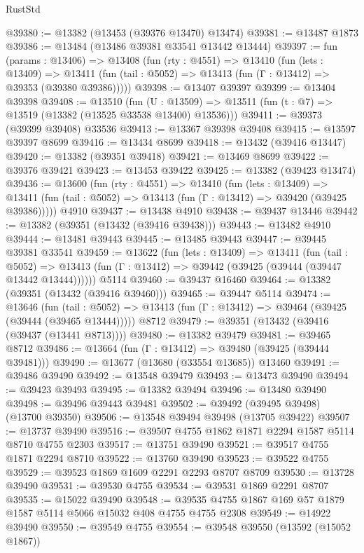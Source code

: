 \begin{lexlean}{RustStd}
\begin{coremodule}
@39380 := @13382 (@13453 (@39376 @13470) @13474)
@39381 := @13487 @1873
@39386 := @13484 (@13486 @39381 @33541 @13442 @13444)
@39397 := fun (params : @13406) =>
  @13408
    (fun (rty : @4551) =>
    @13410
      (fun (lets : @13409) =>
      @13411 (fun (tail : @5052) => @13413 (fun (Γ : @13412) => @39353 (@39380 @39386)))))
@39398 := @13407 @39397
@39399 := @13404 @39398
@39408 := @13510
    (fun (U : @13509) => @13511 (fun (t : @7) => @13519 (@13382 (@13525 @33538 @13400) @13536)))
@39411 := @39373 (@39399 @39408) @33536
@39413 := @13367 @39398 @39408
@39415 := @13597 @39397 @8699
@39416 := @13434 @8699
@39418 := @13432 (@39416 @13447)
@39420 := @13382 (@39351 @39418)
@39421 := @13469 @8699
@39422 := @39376 @39421
@39423 := @13453 @39422
@39425 := @13382 (@39423 @13474)
@39436 := @13600
    (fun (rty : @4551) =>
    @13410
      (fun (lets : @13409) =>
      @13411 (fun (tail : @5052) => @13413 (fun (Γ : @13412) => @39420 (@39425 @39386)))))
    @4910
@39437 := @13438 @4910
@39438 := @39437 @13446
@39442 := @13382 (@39351 (@13432 (@39416 @39438)))
@39443 := @13482 @4910
@39444 := @13481 @39443
@39445 := @13485 @39443
@39447 := @39445 @39381 @33541
@39459 := @13622
    (fun (lets : @13409) =>
    @13411
      (fun (tail : @5052) =>
      @13413 (fun (Γ : @13412) => @39442 (@39425 (@39444 (@39447 @13442 @13444))))))
    @5114
@39460 := @39437 @16460
@39464 := @13382 (@39351 (@13432 (@39416 @39460)))
@39465 := @39447 @5114
@39474 := @13646
    (fun (tail : @5052) => @13413 (fun (Γ : @13412) => @39464 (@39425 (@39444 (@39465 @13444)))))
    @8712
@39479 := @39351 (@13432 (@39416 (@39437 (@13441 @8713))))
@39480 := @13382 @39479
@39481 := @39465 @8712
@39486 := @13664 (fun (Γ : @13412) => @39480 (@39425 (@39444 @39481)))
@39490 := @13677 (@13680 (@33554 @13685)) @13460
@39491 := @39486 @39490
@39492 := @13548 @39479
@39493 := @13473 @39490
@39494 := @39423 @39493
@39495 := @13382 @39494
@39496 := @13480 @39490
@39498 := @39496 @39443 @39481
@39502 := @39492 (@39495 @39498) (@13700 @39350)
@39506 := @13548 @39494 @39498 (@13705 @39422)
@39507 := @13737 @39490
@39516 := @39507 @4755 @1862 @1871 @2294 @1587 @5114 @8710 @4755 @2303
@39517 := @13751 @39490
@39521 := @39517 @4755 @1871 @2294 @8710
@39522 := @13760 @39490
@39523 := @39522 @4755
@39529 := @39523 @1869 @1609 @2291 @2293 @8707 @8709
@39530 := @13728 @39490
@39531 := @39530 @4755
@39534 := @39531 @1869 @2291 @8707
@39535 := @15022 @39490
@39548 := @39535 @4755 @1867 @169 @57 @1879 @1587 @5114 @5066 @15032 @408 @4755 @4755 @2308
@39549 := @14922 @39490
@39550 := @39549 @4755
@39554 := @39548 @39550 (@13592 (@15052 @1867))

\end{coremodule}
\end{lexlean}
